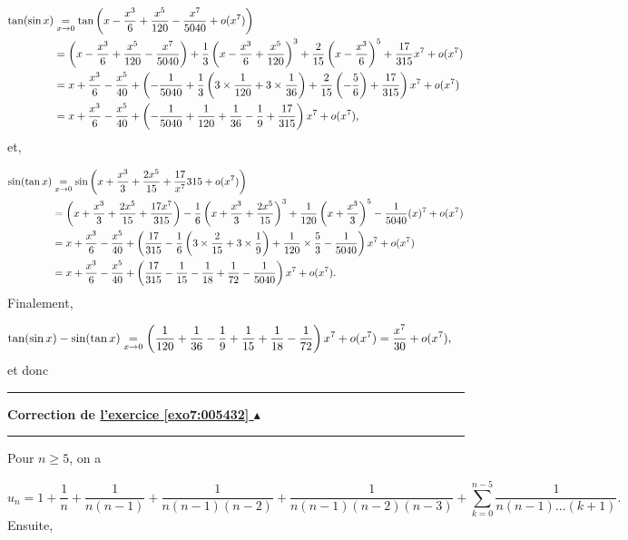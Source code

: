 \documentclass[11pt,a4paper]{article}
\newcounter{exo}
\newcommand{\correction}[1]{\hypertarget{cor7:#1}{}\label{cor7:#1}{\bf Correction de \hyperlink{exo7:#1}{l'exercice \ref{exo7:#1} $\blacktriangle$}}\vspace{1mm}\hrule\vspace{1mm}}
\newcommand{\fincorrection}{\vspace{1mm}\hrule\vspace*{7mm}}
\begin{document}
\begin{enumerate}
\begin{align*}\ensuremath
\tan(\sin x)&\underset{x\rightarrow0}{=}\tan\left(x-\frac{x^3}{6}+\frac{x^5}{120}-\frac{x^7}{5040}+o(x^7)\right)\\
 &=\left(x-\frac{x^3}{6}+\frac{x^5}{120}-\frac{x^7}{5040}\right)+\frac{1}{3}\left(x-\frac{x^3}{6}+\frac{x^5}{120}\right)^3+\frac{2}{15}\left(x-\frac{x^3}{6}\right)^5+\frac{17}{315}x^7+o(x^7)\\
 &=x+\frac{x^3}{6}-\frac{x^5}{40}+\left(-\frac{1}{5040}+\frac{1}{3}\left(3\times\frac{1}{120}+3\times\frac{1}{36}\right)+\frac{2}{15}\left(-\frac{5}{6}\right)+\frac{17}{315}\right)x^7+o(x^7)\\
 &=x+\frac{x^3}{6}-\frac{x^5}{40}+\left(-\frac{1}{5040}+\frac{1}{120}+\frac{1}{36}-\frac{1}{9}+\frac{17}{315}\right)x^7+o(x^7),
\end{align*}
et,

\begin{align*}\ensuremath
\sin(\tan x)&\underset{x\rightarrow0}{=}\sin\left(x+\frac{x^3}{3}+\frac{2x^5}{15}+\frac{17}{x^7}{315}+o(x^7)\right)\\
 &=\left(x+\frac{x^3}{3}+\frac{2x^5}{15}+\frac{17x^7}{315}\right)-\frac{1}{6}\left(x+\frac{x^3}{3}+\frac{2x^5}{15}\right)^3+\frac{1}{120}\left(x+\frac{x^3}{3}\right)^5-\frac{1}{5040}(x)^7+o(x^7)\\
 &= x+\frac{x^3}{6}-\frac{x^5}{40}+\left(\frac{17}{315}
 -\frac{1}{6}\left(3\times\frac{2}{15}+3\times\frac{1}{9}\right)+\frac{1}{120}\times\frac{5}{3}-\frac{1}{5040}\right)x^7+o(x^7)\\
 &=x+\frac{x^3}{6}-\frac{x^5}{40}+\left(\frac{17}{315}-\frac{1}{15}-\frac{1}{18}+\frac{1}{72}-\frac{1}{5040}\right)x^7+o(x^7).
\end{align*}
Finalement,

\begin{align*}\ensuremath
\tan(\sin x)-\sin(\tan x)&\underset{x\rightarrow0}{=}\left(\frac{1}{120}+\frac{1}{36}
-\frac{1}{9}+\frac{1}{15}+\frac{1}{18}-\frac{1}{72}\right)x^7+o(x^7)
=\frac{x^7}{30}+o(x^7),
\end{align*}
et donc

\begin{center}
\end{center}
\end{enumerate}
\fincorrection
\correction{005432}
Pour $n\geq 5$, on a

$$u_n=1+\frac{1}{n}+\frac{1}{n(n-1)}+\frac{1}{n(n-1)(n-2)}+\frac{1}{n(n-1)(n-2)(n-3)}+\sum_{k=0}^{n-5}\frac{1}{n(n-1)...(k+1)}.$$
Ensuite, 
\end{document}
